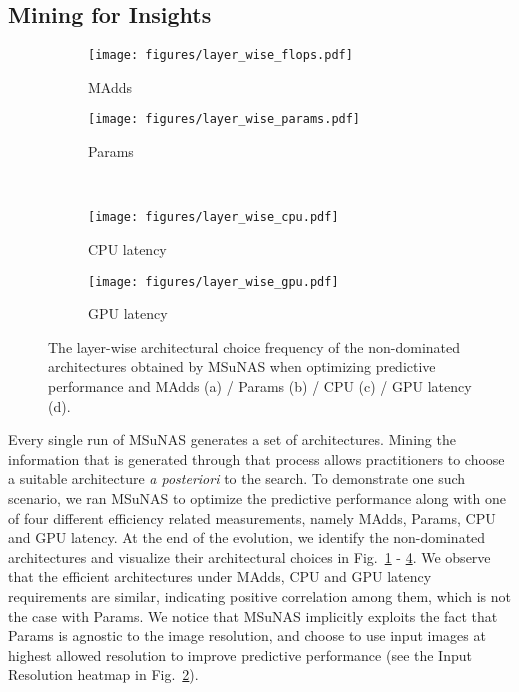 \documentclass[runningheads]{llncs}
\def\ourmethod{MSuNAS}
\begin{document}
\subsection{Mining for Insights\label{sec:insights}}
\begin{figure}[h]
	\centering
	\begin{subfigure}[b]{.48\textwidth}
		\centering
		\texttt{[image: figures/layer\_wise\_flops.pdf]}
		\caption{MAdds\label{fig:layer_wise_flops}}
	\end{subfigure} \hfill
	\begin{subfigure}[b]{.48\textwidth}
		\centering
		\texttt{[image: figures/layer\_wise\_params.pdf]}
		\caption{Params\label{fig:layer_wise_params}}
	\end{subfigure} \\ \vspace{2mm}
	\begin{subfigure}[b]{.48\textwidth}
		\centering
		\texttt{[image: figures/layer\_wise\_cpu.pdf]}
		\caption{CPU latency\label{fig:layer_wise_cpu}}
	\end{subfigure} \hfill
	\begin{subfigure}[b]{.48\textwidth}
		\centering
		\texttt{[image: figures/layer\_wise\_gpu.pdf]}
		\caption{GPU latency\label{fig:layer_wise_gpu}}
	\end{subfigure}
	\caption{The layer-wise architectural choice frequency of the non-dominated architectures obtained by \ourmethod{} when optimizing predictive performance and MAdds (a) / Params (b) / CPU (c) / GPU latency (d).
	\label{fig:layer_wise_distribution}}
\end{figure}
Every single run of \ourmethod{} generates a set of architectures. Mining the information that is generated through that process allows practitioners to choose a suitable architecture \emph{a posteriori} to the search. To demonstrate one such scenario, we ran \ourmethod{} to optimize the predictive performance along with one of  four different efficiency related measurements, namely MAdds, Params, CPU and GPU latency. At the end of the evolution, we identify the non-dominated architectures and visualize their architectural choices in Fig.~\ref{fig:layer_wise_flops} - \ref{fig:layer_wise_gpu}. We observe that the efficient architectures under MAdds, CPU and GPU latency requirements are similar, indicating positive correlation among them, which is not the case with Params. We notice that \ourmethod{} implicitly exploits the fact that Params is agnostic to the image resolution, and choose to use input images at highest allowed resolution to improve predictive performance (see the Input Resolution heatmap in Fig.~\ref{fig:layer_wise_params}).
\end{document}
